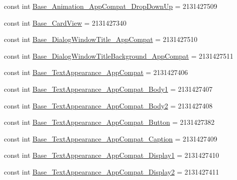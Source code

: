 \begin{DoxyCompactItemize}
\item 
const int \mbox{\hyperlink{class_f_w_p_s___app_1_1_droid_1_1_resource_1_1_style_a0ac74482a48b6815caf6738adadc641f}{Base\+\_\+\+Animation\+\_\+\+App\+Compat\+\_\+\+Drop\+Down\+Up}} = 2131427509
\item 
const int \mbox{\hyperlink{class_f_w_p_s___app_1_1_droid_1_1_resource_1_1_style_ae3b8ab1f59782cac599da313b9d6c2c7}{Base\+\_\+\+Card\+View}} = 2131427340
\item 
const int \mbox{\hyperlink{class_f_w_p_s___app_1_1_droid_1_1_resource_1_1_style_a2d78c568f0e3a3f2602ed21e04458963}{Base\+\_\+\+Dialog\+Window\+Title\+\_\+\+App\+Compat}} = 2131427510
\item 
const int \mbox{\hyperlink{class_f_w_p_s___app_1_1_droid_1_1_resource_1_1_style_a7099a3a0c8b30b64148f48d4b4cbaf98}{Base\+\_\+\+Dialog\+Window\+Title\+Background\+\_\+\+App\+Compat}} = 2131427511
\item 
const int \mbox{\hyperlink{class_f_w_p_s___app_1_1_droid_1_1_resource_1_1_style_a39e91ec3e1d7f95c4b66b7f1e1bf4d25}{Base\+\_\+\+Text\+Appearance\+\_\+\+App\+Compat}} = 2131427406
\item 
const int \mbox{\hyperlink{class_f_w_p_s___app_1_1_droid_1_1_resource_1_1_style_aaf46501693e71fe98af7b7745e65f66d}{Base\+\_\+\+Text\+Appearance\+\_\+\+App\+Compat\+\_\+\+Body1}} = 2131427407
\item 
const int \mbox{\hyperlink{class_f_w_p_s___app_1_1_droid_1_1_resource_1_1_style_a7a04ed4abae346651ec0f96e3f349199}{Base\+\_\+\+Text\+Appearance\+\_\+\+App\+Compat\+\_\+\+Body2}} = 2131427408
\item 
const int \mbox{\hyperlink{class_f_w_p_s___app_1_1_droid_1_1_resource_1_1_style_aada4c77a36d2d01e64cc2de080852510}{Base\+\_\+\+Text\+Appearance\+\_\+\+App\+Compat\+\_\+\+Button}} = 2131427382
\item 
const int \mbox{\hyperlink{class_f_w_p_s___app_1_1_droid_1_1_resource_1_1_style_a47bad56847e9e7cc6a16ffb87466cd24}{Base\+\_\+\+Text\+Appearance\+\_\+\+App\+Compat\+\_\+\+Caption}} = 2131427409
\item 
const int \mbox{\hyperlink{class_f_w_p_s___app_1_1_droid_1_1_resource_1_1_style_a1e222b9076042e13bcfe243404f522a2}{Base\+\_\+\+Text\+Appearance\+\_\+\+App\+Compat\+\_\+\+Display1}} = 2131427410
\item 
const int \mbox{\hyperlink{class_f_w_p_s___app_1_1_droid_1_1_resource_1_1_style_a81fa81973ca11764f9beff3c40e5cbb2}{Base\+\_\+\+Text\+Appearance\+\_\+\+App\+Compat\+\_\+\+Display2}} = 2131427411
\item 

\end{DoxyCompactItemize}
